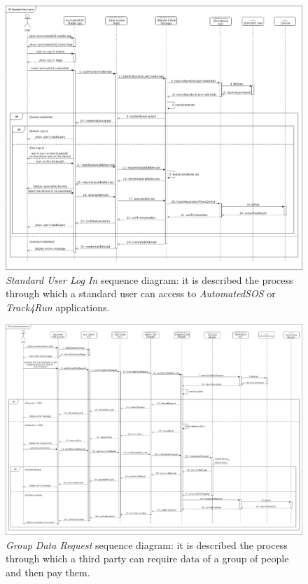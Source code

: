 \begin{figure}[H]
  \begin{center}
  	\includegraphics[width=\textwidth]{./img/sequence/appLogIn.png}
    \hspace{0.05\linewidth}
    \centering
    \caption{\textit{Standard User Log In} sequence diagram: it is described the process through which a standard user can access to \textit{AutomatedSOS} or \textit{Track4Run} applications.}
		\label{img:appLogIn}
    \end{center}
\end{figure}

\begin{figure}[H]
  \begin{center}
  	\includegraphics[width=\textwidth]{./img/sequence/groupDataRequest.png}
    \hspace{0.05\linewidth}
    \centering
    \caption{\textit{Group Data Request} sequence diagram: it is described the process through which a third party can require data of a group of people and then pay them.}
		\label{img:groupDataRequest}
    \end{center}
\end{figure}

